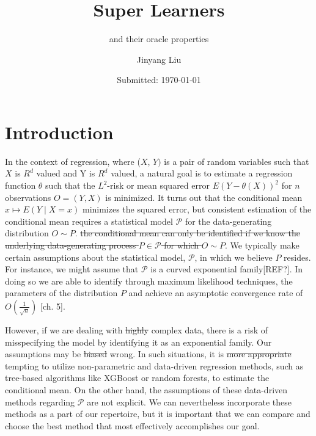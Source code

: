 \documentclass[11pt, a4paper]{article}
\author{Jinyang Liu}
\title{Super Learners}
\subtitle{and their oracle properties}
\date{Submitted: \today}
\renewcommand\tag[1]{\color{blue} #1 \color{black}}
\theoremstyle{definition}
\theoremstyle{remark}
\begin{document}
\begingroup
    \selectfont
    \maketitle
    \tableofcontents
    \newpage
\endgroup


\section{Introduction}
In the context of regression, \tag{where (\(X\), \(Y)\) is a pair of
  random variables such that \(X\) is \(R^d\) valued and Y is \(R^d\)
  valued,} a natural goal is to estimate a regression function
$ \theta $ such that the $ L^2 $-risk or mean squared error
$ E(Y - \theta(X))^2 $ for $ n $ observations $ O = (Y, X) $ is
minimized. It turns out that the conditional mean
$ x \mapsto E(Y \mid X = x) $ minimizes the squared error, but \tag{
  consistent estimation of the conditional mean requires a statistical
  model \(\mathcal{P}\) for the data-generating distribution}
$ O \sim P $. \sout{the
  conditional mean can only be identified if we know the underlying
  data-generating process $ P \in \mathcal{P} $ for which
  $ O \sim P $}. We typically make certain assumptions about the
statistical model, $\mathcal{P}$, in which we believe $P$ resides. For
instance, we might assume that $\mathcal{P}$ is a curved exponential
family[REF?]. In doing so we are able to identify through maximum
likelihood techniques, the parameters of the distribution $ P $ and
achieve an asymptotic convergence rate of
$ O\left(\frac{1}{\sqrt{n}}\right) $
\parencite{lauritzen2022statistics}[ch. 5].

However, if we are dealing with \sout{highly} complex data, there is a
risk of misspecifying the model by identifying it as an exponential
family. Our assumptions may be \sout{biased} \tag{wrong.} In such situations, it is \sout{more
appropriate}\tag{tempting} to utilize non-parametric and data-driven regression
methods, such as tree-based algorithms like XGBoost or random forests,
to estimate the conditional mean. On the other hand, the assumptions
of these data-driven methods regarding $ \mathcal{P} $ are not
explicit. We can nevertheless incorporate these methods as a part of
our repertoire, but it is important that we can compare and choose the
best method that most effectively accomplishes our goal.
\end{document}
